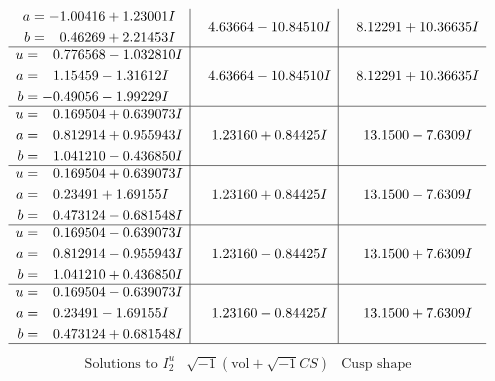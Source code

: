 \documentclass[1p]{elsarticle_modified}
\theoremstyle{definition}
\newcommand{\I}{\sqrt{-1}}
\begin{document}
$$\begin{array}{c|c|c}
\begin{aligned}
a &= -1.00416 + 1.23001 I \\
b &= \phantom{-}0.46269 + 2.21453 I\end{aligned}
 & \phantom{-}4.63664 - 10.84510 I & \phantom{-}8.12291 + 10.36635 I \\ \hline\begin{aligned}
u &= \phantom{-}0.776568 - 1.032810 I \\
a &= \phantom{-}1.15459 - 1.31612 I \\
b &= -0.49056 - 1.99229 I\end{aligned}
 & \phantom{-}4.63664 - 10.84510 I & \phantom{-}8.12291 + 10.36635 I \\ \hline\begin{aligned}
u &= \phantom{-}0.169504 + 0.639073 I \\
a &= \phantom{-}0.812914 + 0.955943 I \\
b &= \phantom{-}1.041210 - 0.436850 I\end{aligned}
 & \phantom{-}1.23160 + 0.84425 I & \phantom{-}13.1500 - 7.6309 I \\ \hline\begin{aligned}
u &= \phantom{-}0.169504 + 0.639073 I \\
a &= \phantom{-}0.23491 + 1.69155 I \\
b &= \phantom{-}0.473124 - 0.681548 I\end{aligned}
 & \phantom{-}1.23160 + 0.84425 I & \phantom{-}13.1500 - 7.6309 I \\ \hline\begin{aligned}
u &= \phantom{-}0.169504 - 0.639073 I \\
a &= \phantom{-}0.812914 - 0.955943 I \\
b &= \phantom{-}1.041210 + 0.436850 I\end{aligned}
 & \phantom{-}1.23160 - 0.84425 I & \phantom{-}13.1500 + 7.6309 I \\ \hline\begin{aligned}
u &= \phantom{-}0.169504 - 0.639073 I \\
a &= \phantom{-}0.23491 - 1.69155 I \\
b &= \phantom{-}0.473124 + 0.681548 I\end{aligned}
 & \phantom{-}1.23160 - 0.84425 I & \phantom{-}13.1500 + 7.6309 I\\
 \hline 
 \end{array}$$\newpage$$\begin{array}{c|c|c}  
\text{Solutions to }I^u_{2}& \I (\text{vol} + \sqrt{-1}CS) & \text{Cusp shape}\\

\end{array}$$
\end{document}
